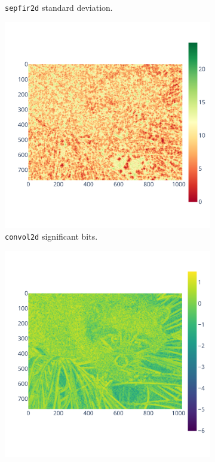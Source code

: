 \documentclass[11pt]{article}
\begin{document}
\begin{figure}
\begin{subfigure}{0.3\linewidth}
    \caption{\texttt{sepfir2d} standard deviation.}
    \label{fig:bspline_bisplev_std}
\end{subfigure}
\begin{subfigure}{0.3\linewidth}
    \includegraphics[width=\linewidth]{figure/bspline/convol2d_sig.pdf}
    \caption{\texttt{convol2d} significant bits.}
    \label{fig:bspline_convol2d_sig}
\end{subfigure}
\begin{subfigure}{0.3\linewidth}
    \includegraphics[width=\linewidth]{figure/bspline/convol2d_mean_log.pdf}

\end{subfigure}
\end{figure}
\end{document}
